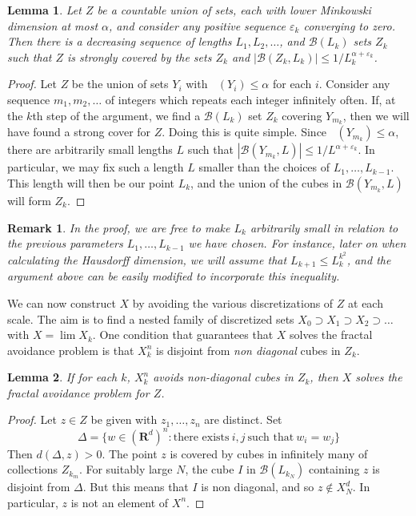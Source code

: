 \documentclass{article}
\theoremstyle{plain}
\newtheorem{lemma}{Lemma}
\theoremstyle{plain}
\newtheorem*{remark}{Remark}
\DeclareMathOperator{\lhdim}{\underline{\dim}_{\mathbf{M}}}
\begin{document}
\begin{lemma}
	Let $Z$ be a countable union of sets, each with lower Minkowski dimension at most $\alpha$, and consider any positive sequence $\varepsilon_k$ converging to zero. Then there is a decreasing sequence of lengths $L_1, L_2, \dots$, and $\mathcal{B}(L_k)$ sets $Z_k$ such that $Z$ is strongly covered by the sets $Z_k$ and $|\mathcal{B}(Z_k, L_k)| \leq 1/L_k^{\alpha + \varepsilon_k}$.
\end{lemma}
\begin{proof}
	Let $Z$ be the union of sets $Y_i$ with $\lhdim(Y_i) \leq \alpha$ for each $i$. Consider any sequence $m_1, m_2, \dots$ of integers which repeats each integer infinitely often. If, at the $k$th step of the argument, we find a $\mathcal{B}(L_k)$ set $Z_k$ covering $Y_{m_k}$, then we will have found a strong cover for $Z$. Doing this is quite simple. Since $\lhdim(Y_{m_k}) \leq \alpha$, there are arbitrarily small lengths $L$ such that $|\mathcal{B}(Y_{m_k},L)| \leq 1/L^{\alpha + \varepsilon_k}$. In particular, we may fix such a length $L$ smaller than the choices of $L_1, \dots, L_{k-1}$. This length will then be our point $L_k$, and the union of the cubes in $\mathcal{B}(Y_{m_k},L)$ will form $Z_k$.
\end{proof}

\begin{remark}
	In the proof, we are free to make $L_k$ arbitrarily small in relation to the previous parameters $L_1, \dots, L_{k-1}$ we have chosen. For instance, later on when calculating the Hausdorff dimension, we will assume that $L_{k+1} \leq L_k^{k^2}$, and the argument above can be easily modified to incorporate this inequality.
\end{remark}

We can now construct $X$ by avoiding the various discretizations of $Z$ at each scale. The aim is to find a nested family of discretized sets $X_0 \supset X_1 \supset X_2 \supset \dots$ with $X = \lim X_k$. One condition that guarantees that $X$ solves the fractal avoidance problem is that $X_k^n$ is disjoint from {\it non diagonal} cubes in $Z_k$.

\begin{lemma}
	If for each $k$, $X_k^n$ avoids non-diagonal cubes in $Z_k$, then $X$ solves the fractal avoidance problem for $Z$.
\end{lemma}
\begin{proof}
	Let $z \in Z$ be given with $z_1, \dots, z_n$ are distinct. Set
	\[ \Delta = \{ w \in (\mathbf{R}^d)^n : \text{there exists}\ i,j\ \text{such that}\ w_i = w_j \} \]
	Then $d(\Delta,z) > 0$. The point $z$ is covered by cubes in infinitely many of collections $Z_{k_m}$. For suitably large $N$, the cube $I$ in $\mathcal{B}(L_{k_N})$ containing $z$ is disjoint from $\Delta$. But this means that $I$ is non diagonal, and so $z \not \in X_N^d$. In particular, $z$ is not an element of $X^n$.
\end{proof}
\end{document}
